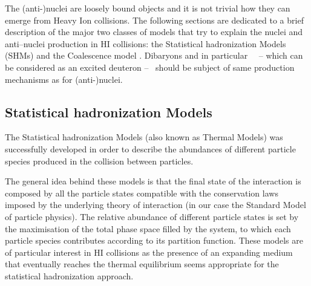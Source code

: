 The (anti-)nuclei are loosely bound objects and it is not trivial how they can emerge from Heavy 
Ion collisions. 
The following sections are dedicated to a brief description of the major two classes of models
that try to explain the nuclei and anti–nuclei production in HI collisions: the Statistical 
hadronization Models (SHMs) and the Coalescence model \cite{deuprod}.
Dibaryons and in particular \dst \ \ -- which can be considered as an excited deuteron -- \ should 
be subject of same production mechanisms as for (anti-)nuclei.

%
\subsection{Statistical hadronization Models} \label{sec:1.4.1}

The Statistical hadronization Models (also known as Thermal Models) was successfully developed
in order to describe the abundances of different particle species produced in the collision 
between particles.

The general idea behind these models is that the final state of the interaction is composed by
all the particle states compatible with the conservation laws imposed by the underlying theory 
of interaction (in our case the Standard Model of particle physics). 
The relative abundance of different particle states is set by the maximisation of the total phase
space filled by the system, to which each particle species contributes according to its partition 
function. These models are of particular interest in HI collisions as the presence of an expanding 
medium that eventually reaches the thermal equilibrium seems appropriate for the statistical
hadronization approach. 

